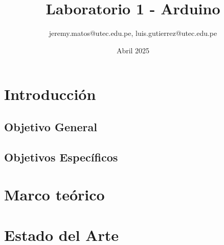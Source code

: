 \documentclass{article}
\title{Laboratorio 1 - Arduino}
\author{jeremy.matos@utec.edu.pe, luis.gutierrez@utec.edu.pe}
\date{Abril 2025}
\begin{document}
\maketitle

\newpage
\tableofcontents
\newpage

\section{Introducción}

\subsection{Objetivo General}

\subsection{Objetivos Espec\'ificos}

\newpage

\section{Marco teórico}


\section{Estado del Arte}
\end{document}
